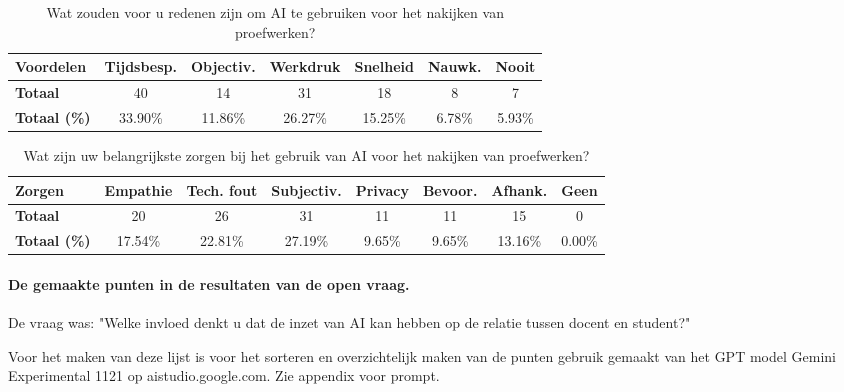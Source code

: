 \documentclass[12pt]{article}
\begin{document}
\noindent
\begin{table}[H]
    \caption{Wat zouden voor u redenen zijn om AI te gebruiken voor het nakijken van proefwerken? }
    \begin{tabular}{l c c c c c c}
        \toprule
        \textbf{Voordelen} & \textbf{Tijdsbesp.} & \textbf{Objectiv.} & \textbf{Werkdruk} & \textbf{Snelheid} & \textbf{Nauwk.} & \textbf{Nooit} \\
        \midrule
        \textbf{Totaal} & 40 & 14 & 31 & 18 & 8 & 7 \\
        \bottomrule
        \textbf{Totaal  (\%)} & 33.90\% & 11.86\% & 26.27\% & 15.25\% & 6.78\% & 5.93\% \\
        \bottomrule
    \end{tabular}
\end{table}


\noindent
\begin{table}[H]
    \caption{Wat zijn uw belangrijkste zorgen bij het gebruik van AI voor het nakijken van proefwerken? }
    \begin{tabular}{l c c c c c c c}
        \toprule
        \textbf{Zorgen} & \textbf{Empathie} & \textbf{Tech. fout} & \textbf{Subjectiv.} & \textbf{Privacy} & \textbf{Bevoor.} & \textbf{Afhank.} & \textbf{Geen} \\
        \midrule
        \textbf{Totaal} & 20 & 26 & 31 & 11 & 11 & 15 & 0  \\
        \textbf{Totaal (\%)} & 17.54\% & 22.81\% & 27.19\% & 9.65\% & 9.65\% & 13.16\% & 0.00\% \\
        \bottomrule
    \end{tabular}
\end{table}

\paragraph*{De gemaakte punten in de resultaten van de open vraag.}

De vraag was: "Welke invloed denkt u dat de inzet van AI kan hebben op de relatie tussen docent en student?"

Voor het maken van deze lijst is voor het sorteren en overzichtelijk maken van de punten gebruik gemaakt van het GPT model Gemini Experimental 1121 op aistudio.google.com. Zie appendix voor prompt.
\end{document}
